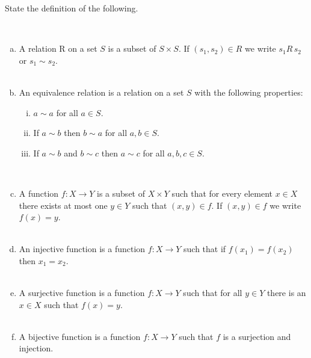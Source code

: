 \documentclass[11pt]{exam}
\theoremstyle{definition}
\begin{document}
\begin{questions}
\question State the definition of the following. 
\ \\
\begin{enumerate}[(a)]
\item A relation R on a set $S$ is a subset of $S\times S$. If $(s_1,s_2)\in R$ we write $s_1 R\, s_2$ or $s_1\sim s_2$. \\ 
\ \\
\item An equivalence relation is a relation on a set $S$ with the following properties: 
\begin{enumerate}[(i)]
\item $a\sim a$ for all $a\in S$. 
\item If $a\sim b$ then $b\sim a$ for all $a,b\in S$. 
\item If $a\sim b$ and $b\sim c$ then $a\sim c$ for all $a,b,c\in S$. 
\end{enumerate}
\ \\
\item A function $f:X\rightarrow Y$ is a subset of $X\times Y$ such that for every element $x\in X$ there exists at most one $y\in Y$ such that $(x,y)\in f$. If $(x,y)\in f$ we write $f(x)=y$. \\
\ \\
\item An injective function is a function $f:X\rightarrow Y$ such that if $f(x_1)=f(x_2)$ then $x_1=x_2$. \\
\ \\
\item A surjective function is a function $f:X\rightarrow Y$ such that for all $y\in Y$ there is an $x\in X$ such that $f(x)=y$. \\
\ \\
\item A bijective function is a function $f:X\rightarrow Y$ such that $f$ is a surjection and injection. 
\end{enumerate}
\newpage 


\end{questions}
\end{document}

